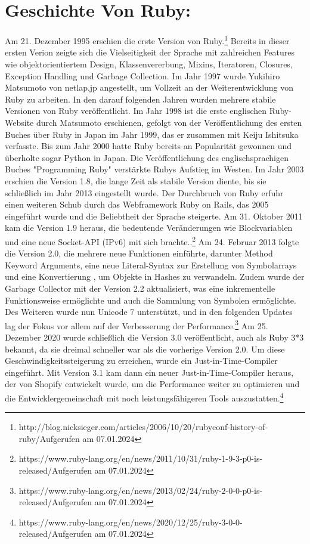 \documentclass{article}
\begin{document}
\section*{Geschichte Von Ruby:}
Am 21. Dezember 1995 erschien die erste Version von Ruby.\footnote{http://blog.nicksieger.com/articles/2006/10/20/rubyconf-history-of-ruby/\label{rubyh}Aufgerufen am 07.01.2024} Bereits in dieser ersten Verion zeigte sich die Vielseitigkeit der Sprache mit zahlreichen Features wie objektorientiertem Design, Klassenvererbung, Mixins, Iteratoren, Closures, Exception Handling und Garbage Collection. Im Jahr 1997 wurde Yukihiro Matsumoto von netlap.jp angestellt, um Vollzeit an der Weiterentwicklung von Ruby zu arbeiten. In den darauf folgenden Jahren wurden mehrere stabile Versionen von Ruby veröffentlicht.
Im Jahr 1998 ist die erste englischen Ruby-Website durch Matsumoto erschienen, gefolgt von der Veröffentlichung des ersten Buches über Ruby in Japan im Jahr 1999, das er zusammen mit Keiju Ishitsuka verfasste. Bis zum Jahr 2000 hatte Ruby bereits an Popularität gewonnen und überholte sogar Python in Japan. Die Veröffentlichung des englischsprachigen Buches "Programming Ruby" verstärkte Rubys Aufstieg im Westen.
Im Jahr 2003 erschien die Version 1.8, die lange Zeit als stabile Version diente, bis sie schließlich im Jahr 2013 eingestellt wurde. Der Durchbruch von Ruby erfuhr einen weiteren Schub durch das Webframework Ruby on Rails, das 2005 eingeführt wurde und die Beliebtheit der Sprache steigerte.
Am 31. Oktober 2011 kam die Version 1.9 heraus, die bedeutende Veränderungen wie Blockvariablen und eine neue Socket-API (IPv6) mit sich brachte..\footnote{https://www.ruby-lang.org/en/news/2011/10/31/ruby-1-9-3-p0-is-released/Aufgerufen am 07.01.2024} Am 24. Februar 2013 folgte die Version 2.0, die mehrere neue Funktionen einführte, darunter Method Keyword Arguments, eine neue Literal-Syntax zur Erstellung von Symbolarrays und eine Konvertierung , um Objekte in Hashes zu verwandeln. Zudem wurde der Garbage Collector mit der Version 2.2 aktualisiert, was eine inkrementelle Funktionsweise ermöglichte und auch die Sammlung von Symbolen ermöglichte. Des Weiteren wurde nun Unicode 7 unterstützt, und in den folgenden Updates lag der Fokus vor allem auf der Verbesserung der Performance.\footnote{https://www.ruby-lang.org/en/news/2013/02/24/ruby-2-0-0-p0-is-released/Aufgerufen am 07.01.2024}
Am 25. Dezember 2020 wurde schließlich die Version 3.0 veröffentlicht, auch als Ruby 3*3 bekannt, da sie dreimal schneller war als die vorherige Version 2.0. Um diese Geschwindigkeitssteigerung zu erreichen, wurde ein Just-in-Time-Compiler eingeführt. Mit Version 3.1 kam dann ein neuer Just-in-Time-Compiler heraus, der von Shopify entwickelt wurde, um die Performance weiter zu optimieren und die Entwicklergemeinschaft mit noch leistungsfähigeren Tools auszustatten.\footnote{https://www.ruby-lang.org/en/news/2020/12/25/ruby-3-0-0-released/Aufgerufen am 07.01.2024}
\end{document}
